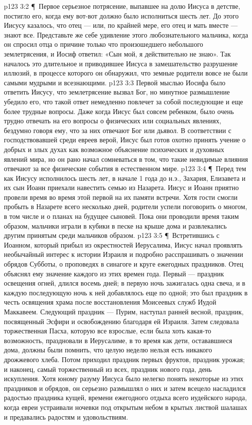 \vs p123 3:2 \P\ Первое серьезное потрясение, выпавшее на долю Иисуса в детстве, постигло его, когда ему вот\hyp{}вот должно было исполниться шесть лет. До этого Иисусу казалось, что отец --- или, по крайней мере, его отец и мать вместе --- знают все. Представьте же себе удивление этого любознательного мальчика, когда он спросил отца о причине только что произошедшего небольшого землетрясения, и Иосиф ответил: «Сын мой, я действительно не знаю». Так началось это длительное и приводившее Иисуса в замешательство разрушение иллюзий, в процессе которого он обнаружил, что земные родители вовсе не были самыми мудрыми и всезнающими.
\vs p123 3:3 Первой мыслью Иосифа было ответить Иисусу, что землетрясение вызвал Бог, но минутное размышление убедило его, что такой ответ немедленно повлечет за собой последующие и еще более трудные вопросы. Даже когда Иисус был совсем ребенком, было очень трудно отвечать на его вопросы о физических или социальных явлениях, бездумно говоря ему, что за них отвечают Бог или дьявол. В соответствии с господствовавшей среди евреев верой, Иисус был готов охотно принять учение о добрых и злых духах как возможное объяснение психических и духовных явлений мира, но он рано начал сомневаться в том, что такие невидимые влияния отвечают за все физические события в естественном мире.
\vs p123 3:4 \P\ Перед тем как Иисусу исполнилось шесть лет, в начале 1 года до н.э., Захария, Елизавета и их сын Иоанн приехали навестить семью из Назарета. Иисус и Иоанн приятно провели время во время этой первой на их памяти встречи. Хотя гости смогли пробыть в Назарете всего несколько дней, родители успели поговорить о многом, в том числе и о планах на будущее сыновей. Пока они проводили время таким образом, мальчики играли в кубики в песке на крыше дома и развлекались другим принятым среди мальчиков образом.
\vs p123 3:5 \P\ Встретившись с Иоанном, который прибыл из окрестностей Иерусалима, Иисус начал проявлять необычайный интерес к истории Израиля и подробно расспрашивать о значении обрядов Субботы, о проповедях в синагоге и круге ежегодных праздников. Отец объяснял ему значение каждого из этих времен года. Первый --- праздник освещения огней, длился восемь дней; в первую ночь зажигалась одна свеча, и в каждую последующую ночь к ней добавлялось еще по одной; это был праздник в честь освящения храма после восстановления Моисеевых служб Иудой Маккавеем. Следующий праздник --- Пурим, наступал ранней весной, праздник, посвященный Эсфири и освобождению благодаря ей Израиля. Затем следовала торжественная Пасха, которую все взрослые, если была хоть какая\hyp{}то возможность, праздновали в Иерусалиме, в то время как дети, остававшиеся дома, должны были помнить, что целую неделю нельзя есть никакого дрожжевого хлеба. Потом приходил праздник первых фруктов, праздник урожая; и наконец, самый торжественный из всех, праздник нового года, день искупления. Хотя юному разуму Иисуса было нелегко понять некоторые из этих праздников и обрядов, он серьезно размышлял о них и затем всецело насладился радостью праздника кущей, времени ежегодного отдыха всего иудейского народа, когда евреи устраивали ночевки под открытым небом в крытых листвой шалашах и предавались радостям и удовольствиям.
